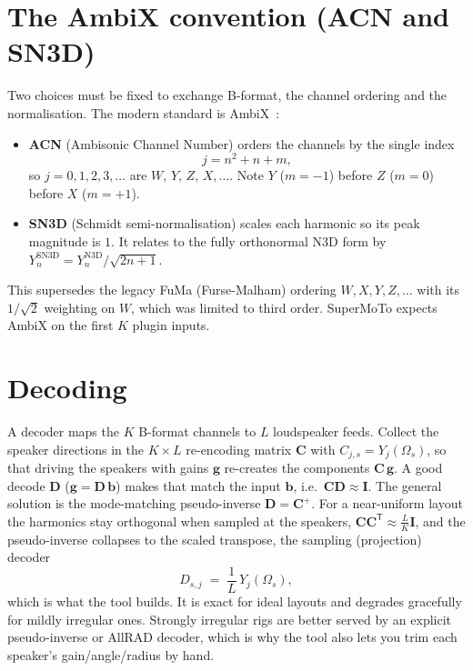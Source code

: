 \section{The AmbiX convention (ACN and SN3D)}
Two choices must be fixed to exchange B-format, the channel ordering and the normalisation. The modern standard is AmbiX~\cite{NachbarAmbiX2011}:
\begin{itemize}[nosep]
  \item \textbf{ACN} (Ambisonic Channel Number) orders the channels by the single index
        \begin{equation}
          j = n^2 + n + m ,
        \end{equation}
        so \(j=0,1,2,3,\dots\) are \(W,\,Y,\,Z,\,X,\dots\). Note \(Y\) (\(m=-1\)) before \(Z\) (\(m=0\)) before \(X\) (\(m=+1\)).
  \item \textbf{SN3D} (Schmidt semi-normalisation) scales each harmonic so its peak magnitude is \(1\). It relates to the fully orthonormal N3D form by \(Y^{\mathrm{SN3D}}_n = Y^{\mathrm{N3D}}_n/\sqrt{2n+1}\).
\end{itemize}
This supersedes the legacy FuMa (Furse-Malham) ordering \(W,X,Y,Z,\dots\) with its \(1/\sqrt2\) weighting on \(W\), which was limited to third order. SuperMoTo expects AmbiX on the first \(K\) plugin inputs.

\section{Decoding}
A decoder maps the \(K\) B-format channels to \(L\) loudspeaker feeds. Collect the speaker directions in the \(K\times L\) re-encoding matrix \(\mathbf{C}\) with \(C_{j,s}=Y_j(\Omega_s)\), so that driving the speakers with gains \(\mathbf g\) re-creates the components \(\mathbf{C}\,\mathbf g\). A good decode \(\mathbf D\) (\(\mathbf g = \mathbf D\,\mathbf b\)) makes that match the input \(\mathbf b\), i.e.\ \(\mathbf{C}\mathbf{D}\approx\mathbf I\). The general solution is the mode-matching pseudo-inverse \(\mathbf D=\mathbf C^{+}\). For a near-uniform layout the harmonics stay orthogonal when sampled at the speakers, \(\mathbf{C}\mathbf{C}^{\mathsf T}\!\approx\!\tfrac{L}{K}\mathbf I\), and the pseudo-inverse collapses to the scaled transpose, the sampling (projection) decoder
\begin{equation}
  D_{s,j} \;=\; \frac{1}{L}\,Y_j(\Omega_s),
  \label{eq:basicdecode}
\end{equation}
which is what the tool builds. It is exact for ideal layouts and degrades gracefully for mildly irregular ones. Strongly irregular rigs are better served by an explicit pseudo-inverse or AllRAD decoder, which is why the tool also lets you trim each speaker's gain/angle/radius by hand.


